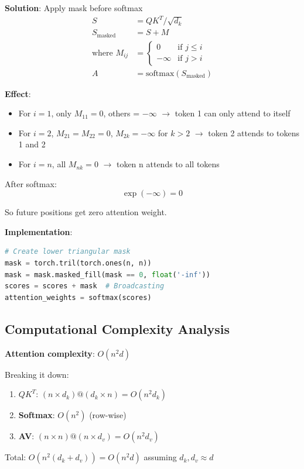 \textbf{Solution}: Apply mask before softmax
\begin{align*}
S &= QK^T / \sqrt{d_k} \\
S_{\text{masked}} &= S + M \\
\text{where } M_{ij} &= \begin{cases} 0 & \text{if } j \leq i \\ -\infty & \text{if } j > i \end{cases} \\
A &= \text{softmax}(S_{\text{masked}})
\end{align*}

\textbf{Effect}:
\begin{itemize}
\item For $i=1$, only $M_{11} = 0$, others = $-\infty$ $\to$ token 1 can only attend to itself
\item For $i=2$, $M_{21} = M_{22} = 0$, $M_{2k} = -\infty$ for $k>2$ $\to$ token 2 attends to tokens 1 and 2
\item For $i=n$, all $M_{nk} = 0$ $\to$ token n attends to all tokens
\end{itemize}

After softmax:
\[
\exp(-\infty) = 0
\]

So future positions get zero attention weight.

\textbf{Implementation}:
\begin{lstlisting}[language=Python]
# Create lower triangular mask
mask = torch.tril(torch.ones(n, n))
mask = mask.masked_fill(mask == 0, float('-inf'))
scores = scores + mask  # Broadcasting
attention_weights = softmax(scores)
\end{lstlisting}

\subsection{Computational Complexity Analysis}

\textbf{Attention complexity}: $O(n^2 d)$

Breaking it down:
\begin{enumerate}
\item \textbf{$QK^T$}: $(n \times d_k) @ (d_k \times n) = O(n^2 d_k)$
\item \textbf{Softmax}: $O(n^2)$ (row-wise)
\item \textbf{AV}: $(n \times n) @ (n \times d_v) = O(n^2 d_v)$
\end{enumerate}

Total: $O(n^2(d_k + d_v)) = O(n^2 d)$ assuming $d_k, d_v \approx d$

